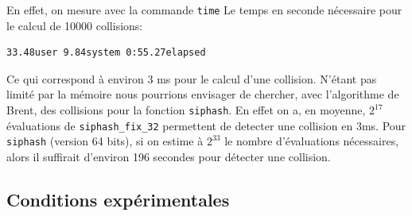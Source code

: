 \documentclass[11pt]{article}
\theoremstyle{definition}
\theoremstyle{definition}
\theoremstyle{definition}
\theoremstyle{theorem}
\theoremstyle{definition}
\begin{document}
En effet, on mesure avec la commande \texttt{time} Le temps en seconde nécessaire pour le calcul de 10000 collisions:
\begin{lstlisting}[basicstyle={\scriptsize\ttfamily}, columns={fixed}, frame={}]
  33.48user 9.84system 0:55.27elapsed
\end{lstlisting}
Ce qui correspond à environ 3 ms pour le calcul d'une collision.
N'étant pas limité par la mémoire nous pourrions envisager de chercher, avec l'algorithme de Brent, des collisions pour la fonction \texttt{siphash}.
En effet on a, en moyenne, $2^{17}$ évaluations de \texttt{siphash\_fix\_32} permettent de detecter une collision en 3ms.
Pour \texttt{siphash} (version 64 bits), si on estime à $2^{33}$ le nombre d'évaluations nécessaires, alors il suffirait d'environ 196 secondes pour détecter une collision.
\subsection{Conditions expérimentales}
\end{document}
